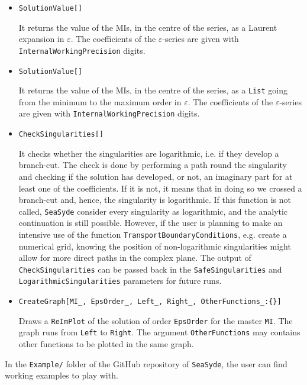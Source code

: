 \begin{itemize}
    \item \texttt{SolutionValue[]}
    
    It returns the value of the MIs, in the centre of the series, as a Laurent expansion in $\varepsilon$. The coefficients of the $\varepsilon$-series are given with \texttt{InternalWorkingPrecision} digits.
    
    \item \texttt{SolutionValue[]}
    
    It returns the value of the MIs, in the centre of the series, as a \texttt{List} going from the minimum to the maximum order in $\varepsilon$. The coefficients of the $\varepsilon$-series are given with \texttt{InternalWorkingPrecision} digits.
    
    \item \texttt{CheckSingularities[]}
    
    It checks whether the singularities are logarithmic, i.e. if they develop a branch-cut. The check is done by performing a path round the singularity and checking if the solution has developed, or not, an imaginary part for at least one of the coefficients. If it is not, it means that in doing so we crossed a branch-cut and, hence, the singularity is logarithmic. If this function is not called, \texttt{SeaSyde} consider every singularity as logarithmic, and the analytic continuation is still possible. However, if the user is planning to make an intensive use of the function \texttt{TransportBoundaryConditions}, e.g. create a numerical grid, knowing the position of non-logarithmic singularities might allow for more direct paths in the complex plane. The output of \texttt{CheckSingularities} can be passed back in the \texttt{SafeSingularities} and \texttt{LogarithmicSingularities} parameters for future runs.
    
    
    
    
    
    
    \item {\texttt{CreateGraph[MI\_, EpsOrder\_, Left\_, Right\_, OtherFunctions\_:\{\}]}}
    
    Draws a \texttt{ReImPlot} of the solution of order \texttt{EpsOrder} for the master \texttt{MI}. The graph runs from \texttt{Left} to \texttt{Right}. 
    The argument \texttt{OtherFunctions} may contains other functions to be plotted in the same graph.
\end{itemize}

In the \texttt{Example/} folder of the GitHub repository of \texttt{SeaSyde}, the user can find working examples to play with.